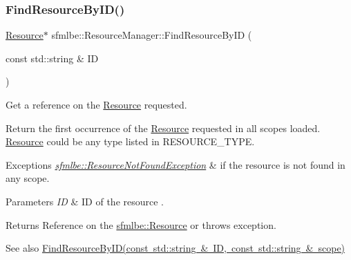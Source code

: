\subsubsection{\texorpdfstring{Find\+Resource\+By\+I\+D()}{FindResourceByID()}\hspace{0.1cm}{\footnotesize\ttfamily [1/2]}}
{\footnotesize\ttfamily \mbox{\hyperlink{classsfmlbe_1_1_resource}{Resource}}$\ast$ sfmlbe\+::\+Resource\+Manager\+::\+Find\+Resource\+By\+ID (\begin{DoxyParamCaption}\item[{const std\+::string \&}]{ID }\end{DoxyParamCaption})}



Get a reference on the \mbox{\hyperlink{classsfmlbe_1_1_resource}{Resource}} requested. 

Return the first occurrence of the \mbox{\hyperlink{classsfmlbe_1_1_resource}{Resource}} requested in all scopes loaded. \mbox{\hyperlink{classsfmlbe_1_1_resource}{Resource}} could be any type listed in R\+E\+S\+O\+U\+R\+C\+E\+\_\+\+T\+Y\+PE. 
\begin{DoxyExceptions}{Exceptions}
{\em \mbox{\hyperlink{classsfmlbe_1_1_resource_not_found_exception}{sfmlbe\+::\+Resource\+Not\+Found\+Exception}}} & if the resource is not found in any scope. \\
\hline
\end{DoxyExceptions}

\begin{DoxyParams}{Parameters}
{\em ID} & ID of the resource . \\
\hline
\end{DoxyParams}
\begin{DoxyReturn}{Returns}
Reference on the \mbox{\hyperlink{classsfmlbe_1_1_resource}{sfmlbe\+::\+Resource}} or throws exception. 
\end{DoxyReturn}
\begin{DoxySeeAlso}{See also}
\mbox{\hyperlink{classsfmlbe_1_1_resource_manager_a7aa9e19b0a5d525a92ac698ad6497487}{Find\+Resource\+By\+I\+D(const std\+::string \& I\+D, const std\+::string \& scope)}} 
\end{DoxySeeAlso}
\mbox{\label{classsfmlbe_1_1_resource_manager_a7aa9e19b0a5d525a92ac698ad6497487}} 
